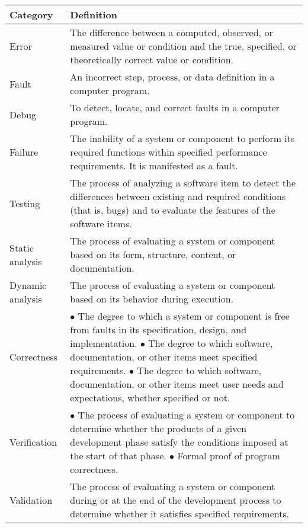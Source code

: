 \begin{tabular}{|p{1.3in}|p{4.7in}|} \hline

{\bf Category}  &    {\bf Definition} \\ \hline \hline
Error    	&    The difference between a computed, observed, or measured value or
                     condition and the true, specified, or theoretically correct value 
                     or condition. \\ \hline
Fault    	&    An incorrect step, process, or data definition in a computer program. \\ \hline
Debug   	&    To detect, locate, and correct faults in a computer program. \\ \hline 
Failure  	&    The inability of a system or component to perform its required functions 
              	     within specified performance requirements.  It is manifested as a fault.  \\ \hline
Testing  	&    The process of analyzing a software item to detect the differences between 
              	     existing and required conditions (that is, bugs) and to evaluate the features 
                     of the software items. \\ \hline
Static analysis &    The process of evaluating a system or component based on its form,
                     structure, content, or documentation. \\ \hline
Dynamic analysis &   The process of evaluating a system or component based on its behavior
                     during execution. \\ \hline
Correctness 	&    $\bullet$ The degree to which a system or component is free from faults in its
                     specification, design, and implementation.  \newline
                     $\bullet$ The degree to which software, documentation, or other items meet
                     specified requirements.  \newline
                     $\bullet$ The degree to which software, documentation, or other items meet user
                     needs and expectations, whether specified or not. \\ \hline
Verification    &    $\bullet$ The process of evaluating a system or component to determine whether the
                     products of a given development phase satisfy the conditions imposed at
                     the start of that phase. \newline 
                     $\bullet$ Formal proof of program correctness. \\ \hline
Validation      &    The process of evaluating a system or component during or at the end of
                     the development process to determine whether it satisfies specified
                     requirements. \\ \hline
\end{tabular}










